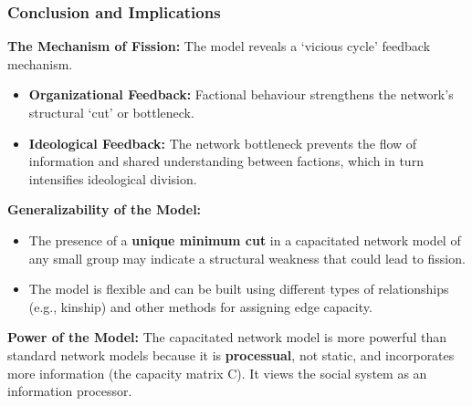 \documentclass{article}
\begin{document}
    \subsubsection{Conclusion and Implications}

    \noindent \textbf{The Mechanism of Fission:} The model reveals a
`vicious cycle' feedback mechanism.
    \begin{itemize}
        \item \textbf{Organizational Feedback:} Factional behaviour
        strengthens the network's structural `cut' or bottleneck.
        \item \textbf{Ideological Feedback:} The network bottleneck prevents
        the flow of information and shared understanding between factions,
        which in turn intensifies ideological division.
    \end{itemize}

    \noindent \textbf{Generalizability of the Model:}
    \begin{itemize}
        \item The presence of a \textbf{unique minimum cut} in a capacitated
        network model of any small group may indicate a structural weakness
        that could lead to fission.
        \item The model is flexible and can be built using different types
        of relationships (e.g., kinship) and other methods for assigning
        edge capacity.
    \end{itemize}

    \noindent \textbf{Power of the Model:} The capacitated network model is
more powerful than standard network models because it is \textbf{processual}, not static, and incorporates more information (the capacity matrix C). It views the social system as an information processor.

 
\end{document}
